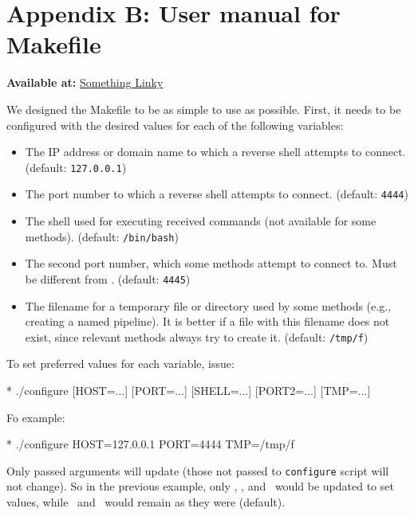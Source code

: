 \newcommand{\target}{\textcolor{placeholder}{\texttt{$\langle$target$\rangle$}}}

\chapter*{Appendix B: User manual for Makefile}

\textbf{Available at:} \href{http://www.overleaf.com}{Something 
Linky}

We designed the Makefile to be as simple to use as possible. First, it needs to be configured with the desired values for each of the following variables:

\setlength{\leftmargini}{5em}
\begin{itemize}
\item[\host] The IP address or domain name to which a reverse shell attempts to connect. (default: \texttt{127.0.0.1})
\item[\port] The port number to which a reverse shell attempts to connect. (default: \texttt{4444})
\item[\shell] The shell used for executing received commands (not available for some methods). (default: \texttt{/bin/bash})
\item[\portt] The second port number, which some methods attempt to connect to. Must be different from \port. (default: \texttt{4445})
\item[\tmp] The filename for a temporary file or directory used by some methods (e.g., creating a named pipeline). It is better if a file with this filename does not exist, since relevant methods always try to create it. (default: \texttt{/tmp/f})
\end{itemize}
\setlength{\leftmargini}{2.5em}

To set preferred values for each variable, issue:

\begin{cmdline}{*}{}{}
./configure [HOST=...] [PORT=...] [SHELL=...] [PORT2=...] [TMP=...]
\end{cmdline}

Fo example:

\begin{cmdline}{*}{}{}
./configure HOST=127.0.0.1 PORT=4444 TMP=/tmp/f
\end{cmdline}

Only passed arguments will update (those not passed to \texttt{configure} script will not change). So in the previous example, only \host, \port, and \tmp\ would be updated to set values, while \shell\ and \portt\ would remain as they were (default).

